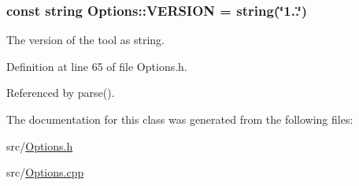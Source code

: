 \hypertarget{classOptions_ab8a901c1ad7d3ab672db099fb4c0b197}{
\subsubsection[{V\-E\-R\-S\-I\-O\-N}]{\setlength{\rightskip}{0pt plus 5cm}const string Options\-::\-V\-E\-R\-S\-I\-O\-N = string(\char`\"{}1..\char`\"{})\hspace{0.3cm}{\ttfamily [static]}}}\label{classOptions_ab8a901c1ad7d3ab672db099fb4c0b197}


The version of the tool as string. 



Definition at line 65 of file Options.\-h.



Referenced by parse().



The documentation for this class was generated from the following files\-:\begin{DoxyCompactItemize}
\item 
src/\hyperlink{Options_8h}{Options.\-h}\item 
src/\hyperlink{Options_8cpp}{Options.\-cpp}\end{DoxyCompactItemize}
